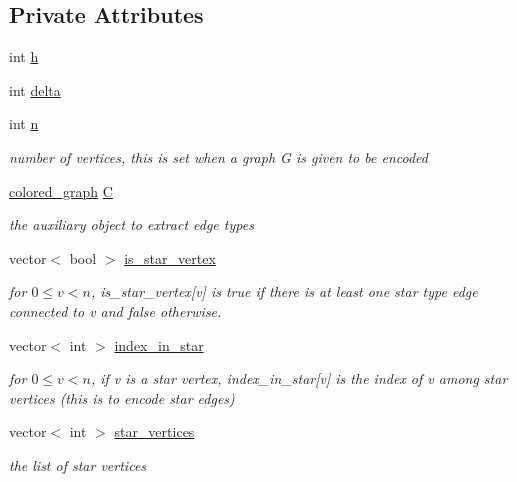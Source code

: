 \subsection*{Private Attributes}
\begin{DoxyCompactItemize}
\item 
int \hyperlink{classmarked__graph__encoder_ae7f8872c57d2d64e4ca6cc47387b9b58}{h}
\item 
int \hyperlink{classmarked__graph__encoder_a29dcf42526b12cf7964a556bb1025c9b}{delta}
\item 
int \hyperlink{classmarked__graph__encoder_a4c66d9fdbc14c97523715aac7e4511cb}{n}
\begin{DoxyCompactList}\small\item\em number of vertices, this is set when a graph G is given to be encoded \end{DoxyCompactList}\item 
\hyperlink{classcolored__graph}{colored\+\_\+graph} \hyperlink{classmarked__graph__encoder_af82bc0653414091291cb75553a407bdb}{C}
\begin{DoxyCompactList}\small\item\em the auxiliary object to extract edge types \end{DoxyCompactList}\item 
vector$<$ bool $>$ \hyperlink{classmarked__graph__encoder_ac36f6c2430af6fa4d20584569859bb59}{is\+\_\+star\+\_\+vertex}
\begin{DoxyCompactList}\small\item\em for $0 \leq v < n$, is\+\_\+star\+\_\+vertex\mbox{[}v\mbox{]} is true if there is at least one star type edge connected to v and false otherwise. \end{DoxyCompactList}\item 
vector$<$ int $>$ \hyperlink{classmarked__graph__encoder_ac3cc1cb565e72a53d35360891f990aa9}{index\+\_\+in\+\_\+star}
\begin{DoxyCompactList}\small\item\em for $0 \leq v < n$, if v is a star vertex, index\+\_\+in\+\_\+star\mbox{[}v\mbox{]} is the index of v among star vertices (this is to encode star edges) \end{DoxyCompactList}\item 
vector$<$ int $>$ \hyperlink{classmarked__graph__encoder_a08fdf6fcd7dcd8c5d1667f2d7ff06c2c}{star\+\_\+vertices}
\begin{DoxyCompactList}\small\item\em the list of star vertices \end{DoxyCompactList}\item 

\end{DoxyCompactItemize}
